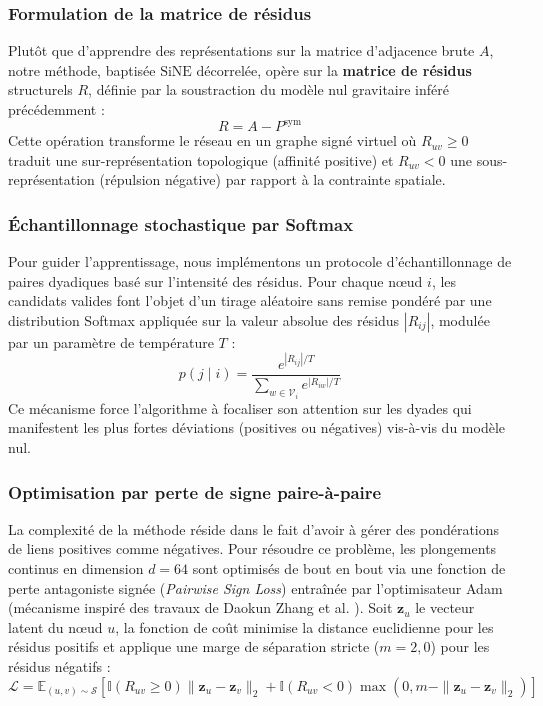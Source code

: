 \subsubsection{Formulation de la matrice de résidus}
Plutôt que d'apprendre des représentations sur la matrice d'adjacence brute $A$, notre méthode, baptisée $\text{SiNE décorrelée}$, opère sur la \textbf{matrice de résidus} structurels $R$, définie par la soustraction du modèle nul gravitaire inféré précédemment :
\begin{equation}
    R = A - P^{\text{sym}}
\end{equation}
Cette opération transforme le réseau en un graphe signé virtuel où $R_{uv} \ge 0$ traduit une sur-représentation topologique (affinité positive) et $R_{uv} < 0$ une sous-représentation (répulsion négative) par rapport à la contrainte spatiale.

\subsubsection{Échantillonnage stochastique par Softmax}
Pour guider l'apprentissage, nous implémentons un protocole d'échantillonnage de paires dyadiques basé sur l'intensité des résidus. Pour chaque nœud $i$, les candidats valides font l'objet d'un tirage aléatoire sans remise pondéré par une distribution Softmax appliquée sur la valeur absolue des résidus $|R_{ij}|$, modulée par un paramètre de température $T$ :
\begin{equation}
    p(j \mid i) = \frac{e^{|R_{ij}| / T}}{\sum_{w \in \mathcal{V}_i} e^{|R_{iw}| / T}}
\end{equation}
Ce mécanisme force l'algorithme à focaliser son attention sur les dyades qui manifestent les plus fortes déviations (positives ou négatives) vis-à-vis du modèle nul.

\subsubsection{Optimisation par perte de signe paire-à-paire} La complexité de la méthode réside dans le fait d'avoir à gérer des pondérations de liens positives comme négatives. Pour résoudre ce problème, les plongements continus en dimension $d=64$ sont optimisés de bout en bout via une fonction de perte antagoniste signée (\textit{Pairwise Sign Loss}) entraînée par l'optimisateur Adam (mécanisme inspiré des travaux de Daokun Zhang et al. \cite{wang2017SINE}). Soit $\mathbf{z}_u$ le vecteur latent du nœud $u$, la fonction de coût minimise la distance euclidienne pour les résidus positifs et applique une marge de séparation stricte ($m=2,0$) pour les résidus négatifs :
\begin{equation}
    \mathcal{L} = \mathbb{E}_{(u,v) \sim \mathcal{S}} \left[ \mathbb{I}(R_{uv} \ge 0) \|\mathbf{z}_u - \mathbf{z}_v\|_2 + \mathbb{I}(R_{uv} < 0) \max\left(0, m - \|\mathbf{z}_u - \mathbf{z}_v\|_2\right) \right]
\end{equation}

